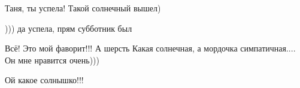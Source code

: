  
 
 
 
 

\qqSecCmt


Таня, ты успела! Такой солнечный вышел)


))) да успела, прям субботник был


Всё! Это мой фаворит!!! А шерсть Какая солнечная, а мордочка симпатичная.... Он
мне нравится очень)))


Ой какое солнышко!!!
